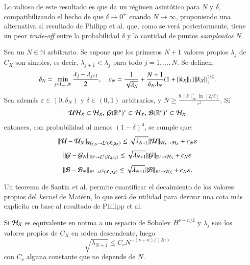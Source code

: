 Lo valioso de este resultado es que da un régimen asintótico para $N$ y $\delta$, compatibilizando el hecho de que $\delta \to 0^+$ cuando $N \to \infty$, proponiendo una alternativa al resultado de Philipp et al. que, como se verá posteriormente, tiene un peor \textit{trade-off} entre la probabilidad $\delta$ y la cantidad de puntos \textit{sampleados} $N$.

\begin{teo}
    Sea un \( N \in \mathbb{N} \) arbitrario. Se supone que los primeros \( N + 1 \) valores propios \( \lambda_j \) de \( C_X \) son simples, es decir, \( \lambda_{j+1} < \lambda_j \) para todo \( j = 1, \ldots, N \). Se definen:
    \[
    \delta_N = \min_{j=1, \ldots, N} \frac{\lambda_j - \lambda_{j+1}}{2}, \quad c_N = \frac{1}{\sqrt{\lambda_N}} + \frac{N + 1}{\delta_N \lambda_N} (1 + \|k_{\mathcal{X}}\|_{1}) \|k_{\mathcal{X}} \|^{1/2}_{1}.
    \]
    Sea además \( \varepsilon \in (0, \delta_N) \) y \( \delta \in (0, 1) \) arbitrarios, y \( N \geq  \frac{8\|k\|^2_\infty \ln(2/\delta)}{\varepsilon^2} \). Si 
    \begin{equation*}
        \mathcal{U} \mathcal{H}_{\mathcal{X}} \subset \mathcal{H}_{\mathcal{X}}, \, \mathcal{G} (\mathbb{R}^p)^* \subset \mathcal{H}_{\mathcal{X}}, \, \mathcal{B} (\mathbb{R}^n)^* \subset \mathcal{H}_{\mathcal{X}}
    \end{equation*}
    entonces, con probabilidad al menos \( (1 - \delta)^4 \), se cumple que:
    \[
    \|\mathcal{U} - \mathcal{U}_N \|_{\mathcal{H}_{\mathcal{X}, N} \to L^2(\mathcal{X}; \mu_{\mathcal{X}})} \leq \sqrt{\lambda_{N+1}} \|\mathcal{U} \|_{\mathcal{H}_{X} \to \mathcal{H_{\mathcal{X}}}} + c_N \varepsilon
    \]
    \[
    \|\mathcal{G} - \mathcal{G}_N \|_{\mathbb{R}^p \to L^2(\mathcal{X}; \mu_{\mathcal{X}})} \leq \sqrt{\lambda_{N+1}} \|\mathcal{G} \|_{\mathbb{R}^p \to \mathcal{H_{\mathcal{X}}}} + c_N \varepsilon
    \]
    \[
    \|\mathcal{B} - \mathcal{B}_N \|_{\mathbb{R}^n \to L^2(\mathcal{X}; \mu_{\mathcal{X}})} \leq \sqrt{\lambda_{N+1}} \|\mathcal{B} \|_{\mathbb{R}^n \to \mathcal{H_{\mathcal{X}}}} + c_N \varepsilon.
    \]
    \label{teo:error_koop}
\end{teo}

Un teorema de Santin et al. permite cuantificar el decaimiento de los valores propios del \textit{kernel} de Matérn, lo que será de utilidad para derivar una cota más explícita en base al resultado de Philipp et al. 

\begin{teo}
    Si $\mathcal{H}_{\mathcal{X}}$ es equivalente en norma a un espacio de Sobolev $H^{\nu + n/2}$ y $\lambda_j$ son los valores propios de $C_X$ en orden descendente, luego
    \begin{equation*}
        \sqrt{\lambda_{N+1}} \leq C_\nu N^{-(\nu + n)/(2n)}
    \end{equation*}
    con $C_\nu$ alguna constante que no depende de $N$.
    \label{teo:eig_val_decay}
\end{teo}

